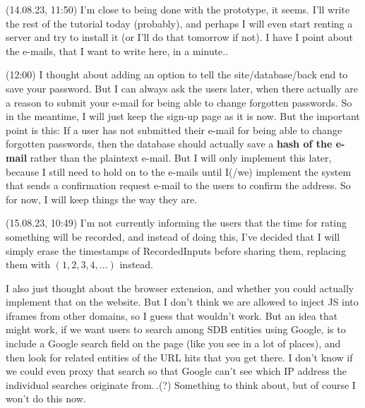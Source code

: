 \documentclass{report}
\begin{document}



(14.08.23, 11:50) I'm close to being done with the prototype, it seems. I'll write the rest of the tutorial today (probably), and perhaps I will even start renting a server and try to install it (or I'll do that tomorrow if not). I have I point about the e-mails, that I want to write here, in a minute..

(12:00) I thought about adding an option to tell the site/database/back end to save your password. But I can always ask the users later, when there actually are a reason to submit your e-mail for being able to change forgotten passwords. So in the meantime, I will just keep the sign-up page as it is now. But the important point is this: If a user has not submitted their e-mail for being able to change forgotten passwords, then the database should actually save a \textbf{hash of the e-mail} rather than the plaintext e-mail. But I will only implement this later, because I still need to hold on to the e-mails until I(/we) implement the system that sends a confirmation request e-mail to the users to confirm the address. So for now, I will keep things the way they are.

(15.08.23, 10:49) I'm not currently informing the users that the time for rating something will be recorded, and instead of doing this, I've decided that I will simply erase the timestamps of RecordedInputs before sharing them, replacing them with $(1, 2, 3, 4, \ldots)$ instead.

I also just thought about the browser extension, and whether you could actually implement that on the website. But I don't think we are allowed to inject JS into iframes from other domains, so I guess that wouldn't work. But an idea that might work, if we want users to search among SDB entities using Google, is to include a Google search field on the page (like you see in a lot of places), and then look for related entities of the URL hits that you get there. I don't know if we could even proxy that search so that Google can't see which IP address the individual searches originate from.\,.(?) Something to think about, but of course I won't do this now.
\end{document}
